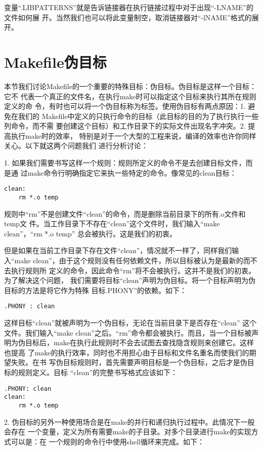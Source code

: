 变量“.LIBPATTERNS”就是告诉链接器在执行链接过程中对于出现“-LNAME”的文件如何展
开。当然我们也可以将此变量制空，取消链接器对“-lNAME”格式的展开。

\section{Makefile伪目标}
本节我们讨论Makefile的一个重要的特殊目标：伪目标。伪目标是这样一个目标：它不
代表一个真正的文件名，在执行make时可以指定这个目标来执行其所在规则定义的命
令，有时也可以将一个伪目标称为标签。使用伪目标有两点原因：1. 避免在我们的
Makefile中定义的只执行命令的目标（此目标的目的为了执行执行一些列命令，而不需
要创建这个目标）和工作目录下的实际文件出现名字冲突。2. 提高执行make时的效率，
特别是对于一个大型的工程来说，编译的效率也许你同样关心。以下就这两个问题我们
进行分析讨论：

1.  如果我们需要书写这样一个规则：规则所定义的命令不是去创建目标文件，而是通
过make命令行明确指定它来执一些特定的命令。像常见的clean目标：

\begin{Verbatim}[]
clean:
    rm *.o temp
\end{Verbatim}
\noindent
规则中“rm”不是创建文件“clean”的命令，而是删除当前目录下的所有.o文件和temp文
件。当工作目录下不存在“clean”这个文件时，我们输入“make clean”，“rm *.o temp”
总会被执行。这是我们的初衷。

但是如果在当前工作目录下存在文件“clean”，情况就不一样了，同样我们输入“make
clean”，由于这个规则没有任何依赖文件，所以目标被认为是最新的而不去执行规则所
定义的命令，因此命令“rm”将不会被执行。这并不是我们的初衷。为了解决这个问题，
我们需要将目标“clean”声明为伪目标。将一个目标声明为伪目标的方法是将它作为特殊
目标.PHONY”的依赖。如下：

\begin{Verbatim}[]
.PHONY : clean
\end{Verbatim}
\noindent
这样目标“clean”就被声明为一个伪目标，无论在当前目录下是否存在“clean”
这个文件。我们输入“make clean”之后。“rm”命令都会被执行。而且，当一个目标被声
明为伪目标后，make在执行此规则时不会去试图去查找隐含规则来创建它。这样也提高
了make的执行效率，同时也不用担心由于目标和文件名重名而使我们的期望失败。在书
写伪目标规则时，首先需要声明目标是一个伪目标，之后才是伪目标的规则定义。目标
“clean”的完整书写格式应该如下：

\begin{Verbatim}[]
.PHONY: clean
clean:
    rm *.o temp
\end{Verbatim}

2. 伪目标的另外一种使用场合是在make的并行和递归执行过程中。此情况下一般会存在
一个变量，定义为所有需要make的子目录。对多个目录进行make的实现方式可以是：在
一个规则的命令行中使用shell循环来完成。如下：

